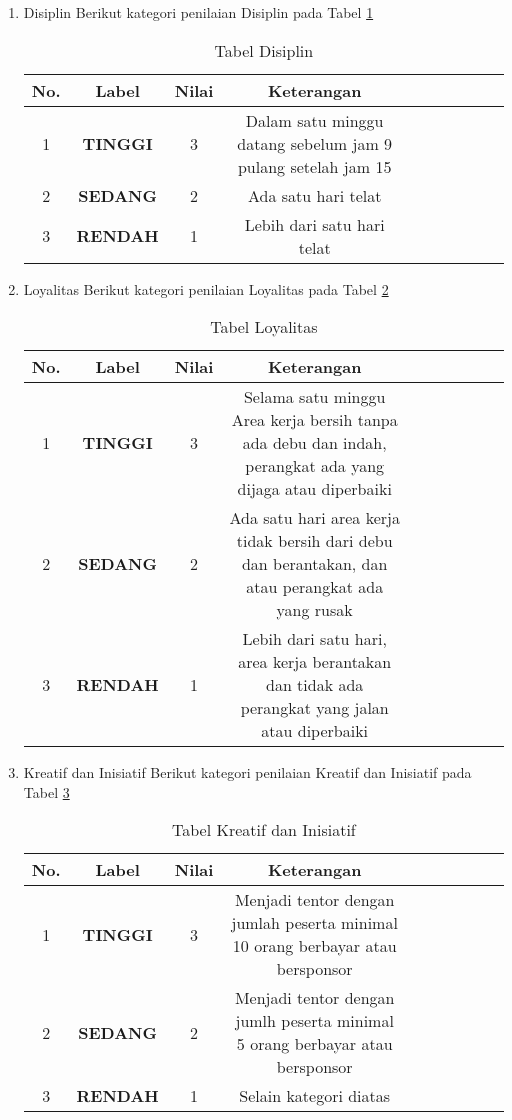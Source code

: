 \begin{enumerate}
\item Disiplin
Berikut kategori penilaian Disiplin pada Tabel \ref{table:Disiplin}
\begin{table}[!htbp]
\centering
\begin{tabular}{ |c|c|c|c|c|c|c|c|c|c| }
\hline
No. & Label & Nilai & Keterangan \\
\hline
1 & \textbf{TINGGI} & 3 & Dalam satu minggu datang sebelum jam 9 pulang setelah jam 15 \\
\hline
2 & \textbf{SEDANG} & 2 & Ada satu hari telat \\
\hline
3 & \textbf{RENDAH} & 1 & Lebih dari satu hari telat \\
\hline
\end{tabular}
\caption{Tabel Disiplin}
\label{table:Disiplin}
\end{table}  

\item Loyalitas
Berikut kategori penilaian Loyalitas pada Tabel \ref{table:Loyalitas}
\begin{table}[!htbp]
\centering
\begin{tabular}{ |c|c|c|c|c|c|c|c|c|c| }
\hline
No. & Label & Nilai & Keterangan \\
\hline
1 & \textbf{TINGGI} & 3 & Selama satu minggu Area kerja bersih tanpa ada debu dan indah, perangkat ada yang dijaga atau diperbaiki \\
\hline
2 & \textbf{SEDANG} & 2 & Ada satu hari area kerja tidak bersih dari debu dan berantakan, dan atau perangkat ada yang rusak \\
\hline
3 & \textbf{RENDAH} & 1 & Lebih dari satu hari, area kerja berantakan dan tidak ada perangkat yang jalan atau diperbaiki \\
\hline
\end{tabular}
\caption{Tabel Loyalitas}
\label{table:Loyalitas}
\end{table}  

\item Kreatif dan Inisiatif
Berikut kategori penilaian Kreatif dan Inisiatif pada Tabel \ref{table:KnI}
\begin{table}[!htbp]
\centering
\begin{tabular}{ |c|c|c|c|c|c|c|c|c|c| }
\hline
No. & Label & Nilai & Keterangan \\
\hline
1 & \textbf{TINGGI} & 3 & Menjadi tentor dengan jumlah peserta minimal 10 orang berbayar atau bersponsor \\
\hline
2 & \textbf{SEDANG} & 2 & Menjadi tentor dengan jumlh peserta minimal 5 orang berbayar atau bersponsor \\
\hline
3 & \textbf{RENDAH} & 1 & Selain kategori diatas \\
\hline
\end{tabular}
\caption{Tabel Kreatif dan Inisiatif}
\label{table:KnI}
\end{table} 
\end{enumerate}
